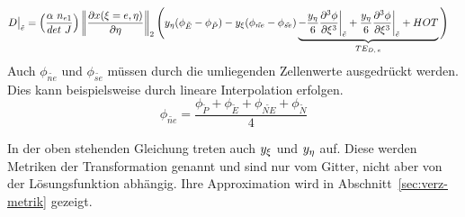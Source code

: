 \begin{align*}
  D\big\vert_{\tilde{e}} &=
  \left({\frac{\alpha\ n_{e1}}{det\ J}}\right)
  \left\lVert \frac{\partial x(\xi=e, \eta)}{\partial \eta} \right\rVert_2 
  \Bigg(y_{\eta}(\phi_{\tilde{E}}-\phi_{\tilde{P}}) - y_{\xi}(\phi_{\tilde{ne}}-\phi_{\tilde{se}})
      \underbrace{ -\frac{y_{\eta}}{6} \frac{\partial^3 \phi}{\partial \xi^3} \bigg\vert_{\tilde{e}}
      +\frac{y_{\eta}}{6} \frac{\partial^3 \phi}{\partial \xi^3} \bigg\vert_{\tilde{e}}
+ HOT}_{TE_{D,\,e}}\Bigg)
\end{align*}
Auch $\phi_{\tilde{ne}}$ und $\phi_{\tilde{se}}$ müssen durch die umliegenden Zellenwerte ausgedrückt werden.
Dies kann beispielsweise durch lineare Interpolation erfolgen.
\begin{equation}
\phi_{\tilde{ne}} = \frac{\phi_{\tilde{P}} +\phi_{\tilde{E}} + \phi_{\tilde{NE}}+ \phi_{\tilde{N}}}{4} 
\end{equation}

In der oben stehenden Gleichung treten auch $y_{\xi}$ und $y_{\eta}$ auf. Diese werden Metriken der Transformation genannt und
sind nur vom Gitter, nicht aber von der Lösungsfunktion abhängig. Ihre Approximation
wird in Abschnitt~\ref{sec:verz-metrik} gezeigt.





